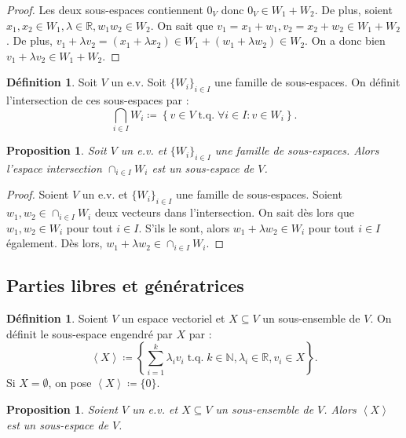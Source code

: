 \documentclass{article}
\DeclareMathOperator{\tq}{\text{ t.q. }}
\newcommand{\N}{\mathbb N}
\newcommand{\R}{\mathbb R}
\newcommand{\eng}[1]{\left\langle#1\right\rangle}
\newtheorem{prp}[thm]{Proposition}
\theoremstyle{definition}
\newtheorem{déf}[thm]{Définition}
\theoremstyle{remark}
\begin{document}
		\begin{proof} Les deux sous-espaces contiennent $0_V$ donc $0_V \in W_1+W_2$. De plus, soient $x_1, x_2 \in W_1, \lambda \in \R, w_1 w_2 \in W_2$. On sait que
		$v_1 = x_1 + w_1, v_2 = x_2 + w_2 \in W_1+W_2$. De plus, $v_1 + \lambda v_2 = (x_1 + \lambda x_2) \in W_1 + (w_1 + \lambda w_2) \in W_2$. On a donc bien
		$v_1 + \lambda v_2 \in W_1 + W_2$. \end{proof}

		\begin{déf} Soit $V$ un e.v. Soit $\{W_i\}_{i \in I}$ une famille de sous-espaces. On définit l'intersection de ces sous-espaces par :
		\[\bigcap_{i \in I}W_i \coloneqq \left\{v \in V \tq \forall i \in I : v \in W_i\right\}.\]\end{déf}

		\begin{prp} Soit $V$ un e.v. et $\{W_i\}_{i \in I}$ une famille de sous-espaces. Alors l'espace intersection $\cap_{i \in I}W_i$ est un sous-espace de $V$. \end{prp}

		\begin{proof} Soient $V$ un e.v. et $\{W_i\}_{i \in I}$ une famille de sous-espaces. Soient $w_1, w_2 \in \cap_{i \in I}W_i$ deux vecteurs dans l'intersection.
		On sait dès lors que $w_1, w_2 \in W_i$ pour tout $i \in I$. S'ils le sont, alors $w_1 + \lambda w_2 \in W_i$ pour tout $i \in I$ également. Dès lors,
		$w_1 + \lambda w_2 \in \cap_{i \in I}W_i$. \end{proof}

	\subsection{Parties libres et génératrices}
		\begin{déf} Soient $V$ un espace vectoriel et $X \subseteq V$ un sous-ensemble de $V$. On définit le sous-espace engendré par $X$ par :
		\[\eng X \coloneqq \left\{\sum_{i=1}^k\lambda_iv_i \tq k \in \N, \lambda_i \in \R, v_i \in X\right\}.\] Si $X = \emptyset$, on pose $\eng X \coloneqq \{0\}$. \end{déf}

		\begin{prp} Soient $V$ un e.v. et $X \subseteq V$ un sous-ensemble de $V$. Alors $\eng X$ est un sous-espace de $V$. \end{prp}
\end{document}
